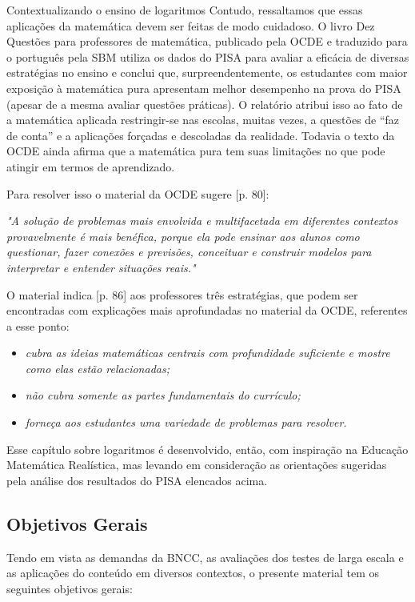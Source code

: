 \begin{apresentacao}{Contextualizando o ensino de logaritmos}
Contudo, ressaltamos que essas aplicações da matemática devem ser feitas de modo cuidadoso. O livro Dez Questões para professores de matemática, publicado pela OCDE e traduzido para o português pela SBM \citep{OCDE2018} utiliza os dados do PISA para avaliar a eficácia de diversas estratégias no ensino e conclui que, surpreendentemente, os estudantes com maior exposição à matemática pura apresentam melhor desempenho na prova do PISA (apesar de a mesma avaliar questões práticas). O relatório atribui isso ao fato de a matemática aplicada restringir-se nas escolas, muitas vezes, a questões de “faz de conta” e a aplicações forçadas e descoladas da realidade. Todavia o texto da OCDE ainda afirma que a matemática pura tem suas limitações no que pode atingir em termos de aprendizado.

Para resolver isso o material da OCDE sugere [p. 80]:

\textit {"A solução de problemas mais envolvida e multifacetada em diferentes contextos provavelmente é mais benéfica, porque ela pode ensinar aos alunos como questionar, fazer conexões e previsões, conceituar e construir modelos para interpretar e entender situações reais."}

O material indica [p. 86] aos professores três estratégias, que podem ser encontradas com explicações mais aprofundadas no material da OCDE, referentes a esse ponto:
\begin{itemize}
\item \textit{cubra as ideias matemáticas centrais com profundidade suficiente e mostre como elas estão relacionadas;}
\item \textit{não cubra somente as partes fundamentais do currículo;}
\item \textit{forneça aos estudantes uma variedade de problemas para resolver.}
\end{itemize}
    
Esse capítulo sobre logaritmos é desenvolvido, então, com inspiração na Educação Matemática Realística, mas levando em consideração as orientações sugeridas pela análise dos resultados do PISA elencados acima.

\subsection*{Objetivos Gerais}

Tendo em vista as demandas da BNCC, as avaliações dos testes de larga escala e as aplicações do conteúdo em diversos contextos, o presente material tem os seguintes objetivos gerais:


\end{apresentacao}
